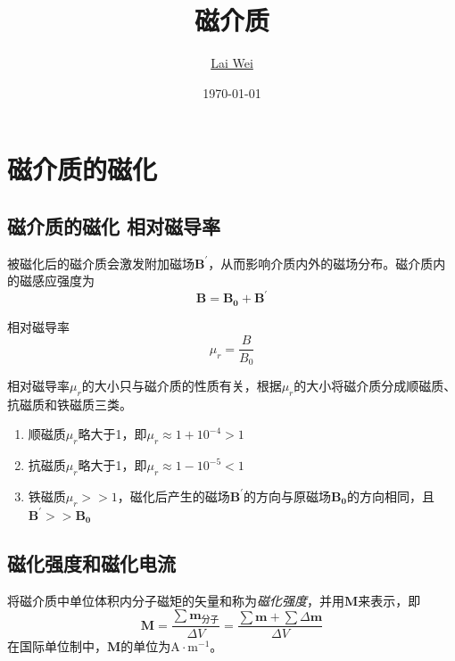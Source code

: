 \documentclass[12pt]{article}
\title{磁介质}
\author{\href{mailto:lai-wei@whu.edu.cn}{Lai Wei}}
\date{\today}
\begin{document}
\maketitle
 
\section{磁介质的磁化}

\subsection{磁介质的磁化 \quad 相对磁导率}

被磁化后的磁介质会激发附加磁场\(\boldsymbol{B^\prime}\)，从而影响介质内外的磁场分布。磁介质内的磁感应强度为
\begin{equation}
    \boldsymbol{B} = \boldsymbol{B_0} + \boldsymbol{B^ \prime}
\end{equation}

相对磁导率
\begin{equation}
    \mu_r = \frac{B}{B_0}
\end{equation}

相对磁导率\(\mu_r\)的大小只与磁介质的性质有关，根据\(\mu_r\)的大小将磁介质分成顺磁质、抗磁质和铁磁质三类。

\begin{enumerate}
    \item 顺磁质\(\mu_r\)略大于1，即\(\mu_r \approx 1 + 10^{-4} > 1\)
    \item 抗磁质\(\mu_r\)略大于1，即\(\mu_r \approx 1 - 10^{-5} < 1\)
    \item 铁磁质\(\mu_r >> 1\)，磁化后产生的磁场\(\boldsymbol{B^\prime}\)的方向与原磁场\(\boldsymbol{B_0}\)的方向相同，且\(\boldsymbol{B^\prime} >> \boldsymbol{B_0}\)
\end{enumerate}

\subsection{磁化强度和磁化电流}

将磁介质中单位体积内分子磁矩的矢量和称为\emph{磁化强度}，并用\(\boldsymbol{M}\)来表示，即
\begin{equation}
    \boldsymbol{M} = \frac{\sum \boldsymbol{m_{\text{分子}}}}{\Delta V} = \frac{\sum \boldsymbol{m} + \sum \Delta \boldsymbol{m}}{\Delta V}
\end{equation}
在国际单位制中，\(\boldsymbol{M}\)的单位为\(\mathrm{A} \cdot \mathrm{m}^{-1}\)。
\end{document}
